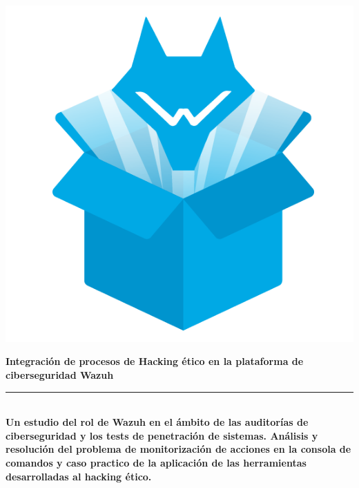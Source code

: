 \begin{titlepage}
 
 
\setlength{\centeroffset}{-0.5\oddsidemargin}
\addtolength{\centeroffset}{0.5\evensidemargin}
\thispagestyle{empty}

\noindent\hspace*{\centeroffset}\begin{minipage}{\textwidth}

\centering

% 

\includegraphics{imagenes/logo.png} 


{\Huge\bfseries Integración de procesos de Hacking ético en la plataforma de ciberseguridad Wazuh\\
}
\noindent\rule[-1ex]{\textwidth}{3pt}\\[3.5ex]
{\large\bfseries Un estudio del rol de Wazuh en el ámbito de las auditorías de ciberseguridad y los tests de penetración de sistemas. Análisis y resolución del problema de monitorización de acciones en la consola de comandos y caso practico de la aplicación de las herramientas desarrolladas al hacking ético.\\[4cm]}
\end{minipage}


\end{titlepage}
